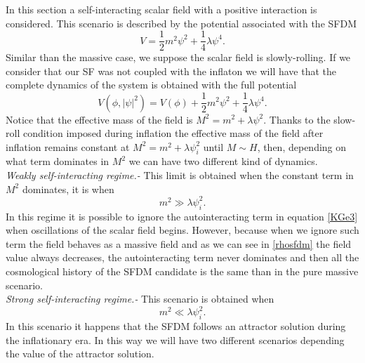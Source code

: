 \documentclass[amssymb,twocolumn,prd,nofootinbib,showpacs]{revtex4-1}
\begin{document}
In this section a self-interacting scalar field with a positive interaction is considered. This scenario is described by the potential associated with the SFDM
\begin{equation}
V = \frac{1}{2}m^2\psi^2+\frac{1}{4}\lambda \psi^4.
\end{equation}
Similar than the massive case, we suppose the scalar field is slowly-rolling. If we consider that our SF was not coupled with the inflaton we will have that the complete dynamics of the system is obtained with the full potential 
\begin{equation}
V(\phi,|\psi|^2)=V(\phi)+\frac{1}{2}m^2\psi^2+\frac{1}{4}\lambda\psi^4.
\end{equation}
Notice that the effective mass of the field is $M^2=m^2+\lambda\psi^2$. Thanks to the slow-roll condition imposed during inflation the effective mass of the field after inflation remains constant at $M^2=m^2+\lambda\psi_i^2$ until $M\sim H$, then, depending on what term dominates in $M^2$ we can have two different kind of dynamics. 
\\

\textit{Weakly self-interacting regime.-} This limit is obtained when the constant term in $M^2$ dominates, it is when
\begin{equation}\label{consw}
m^2\gg \lambda\psi_i^2.
\end{equation}
In this regime it is possible to ignore the autointeracting term in equation \eqref{KGe3} when oscillations of the scalar field begins. However, because when we ignore such term the field behaves as a massive field and as we can see in \eqref{rhosfdm} the field value always decreases, the autointeracting term never dominates and then all the cosmological history of the SFDM candidate is the same than in the pure massive scenario. 
\\

\textit{Strong self-interacting regime.-} This scenario is obtained when 
\begin{equation}
m^2\ll \lambda\psi_i^2.
\end{equation}
In this scenario it happens that the SFDM follows an attractor solution during the inflationary era. In this way we will have two different scenarios depending the value of the attractor solution.
\\
\end{document}

